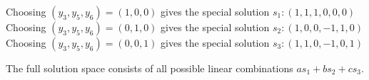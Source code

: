 \documentclass[letterpaper,10pt,english]{jupyterBook}
\begin{document}
\sphinxAtStartPar
Choosing \((y_3,y_5,y_6)=(1,0,0)\) gives the special solution \(s_1:(1,1,1,0,0,0)\)Choosing \((y_3,y_5,y_6)=(0,1,0)\) gives the special solution \(s_2:(1,0,0,-1,1,0)\)Choosing \((y_3,y_5,y_6)=(0,0,1)\) gives the special solution \(s_3:(1,1,0,-1,0,1)\)

\sphinxAtStartPar
The full solution space consists of all possible linear combinations \(a s_1 + b s_2 +c s_3\).







\renewcommand{\indexname}{Index}
\printindex
\end{document}

